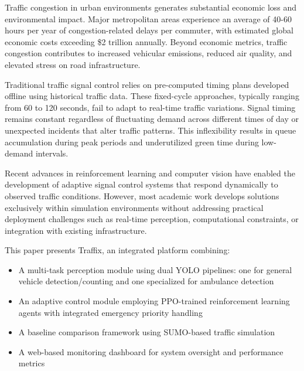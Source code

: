 \documentclass[10pt,conference]{IEEEtran}
\begin{document}
Traffic congestion in urban environments generates substantial economic loss and environmental impact. Major metropolitan areas experience an average of 40-60 hours per year of congestion-related delays per commuter, with estimated global economic costs exceeding \$2 trillion annually. Beyond economic metrics, traffic congestion contributes to increased vehicular emissions, reduced air quality, and elevated stress on road infrastructure.

Traditional traffic signal control relies on pre-computed timing plans developed offline using historical traffic data. These fixed-cycle approaches, typically ranging from 60 to 120 seconds, fail to adapt to real-time traffic variations. Signal timing remains constant regardless of fluctuating demand across different times of day or unexpected incidents that alter traffic patterns. This inflexibility results in queue accumulation during peak periods and underutilized green time during low-demand intervals.

Recent advances in reinforcement learning and computer vision have enabled the development of adaptive signal control systems that respond dynamically to observed traffic conditions. However, most academic work develops solutions exclusively within simulation environments without addressing practical deployment challenges such as real-time perception, computational constraints, or integration with existing infrastructure.

This paper presents Traffix, an integrated platform combining:
\begin{itemize}
    \item A multi-task perception module using dual YOLO pipelines: one for general vehicle detection/counting and one specialized for ambulance detection
    \item An adaptive control module employing PPO-trained reinforcement learning agents with integrated emergency priority handling
    \item A baseline comparison framework using SUMO-based traffic simulation
    \item A web-based monitoring dashboard for system oversight and performance metrics
\end{itemize}
\end{document}

